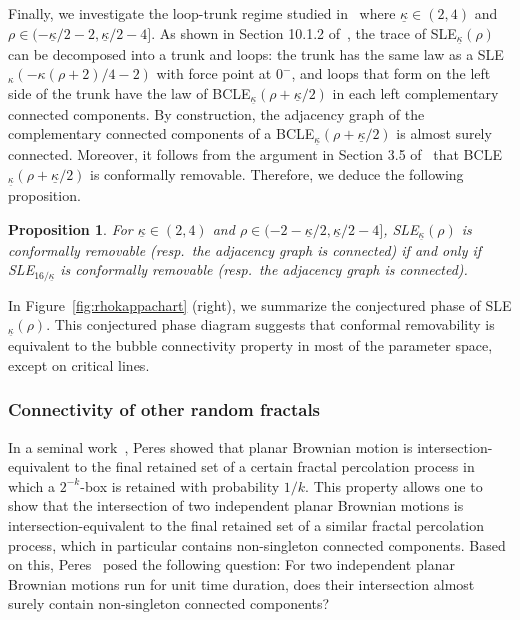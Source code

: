 \documentclass[a4paper]{article}
\numberwithin{equation}{section}
\newtheorem{proposition}[theorem]{Proposition}
\numberwithin{equation}{section}
\renewcommand{\1}{\mathbf{1}}
\begin{document}
Finally, we investigate the loop-trunk regime studied in~\cite{CLEpercolation} where $\underline{\kappa} \in (2,4)$ and $\rho \in (-\underline{\kappa}/2-2, \underline{\kappa}/2-4]$. As shown in Section 10.1.2 of~\cite{CLEpercolation}, the trace of SLE$_{\underline{\kappa}}(\rho)$ can be decomposed into a trunk and loops: the trunk has the same law as a SLE$_{\kappa}(-\kappa(\rho+2)/4-2)$ with force point at $0^-$, and loops that form on the left side of the trunk have the law of BCLE$_{\underline{\kappa}}(\rho + \underline{\kappa}/2)$ in each left complementary connected components. By construction, the adjacency graph of the complementary connected components of a BCLE$_{\underline{\kappa}}(\rho + \underline{\kappa}/2)$ is almost surely connected. Moreover, it follows from the argument in Section 3.5 of~\cite{DMS21-LQG-MRT} that BCLE$_{\underline{\kappa}}(\rho + \underline{\kappa}/2)$ is conformally removable. Therefore, we deduce the following proposition.

\begin{proposition}
    For $\underline{\kappa} \in (2,4)$ and $\rho \in (-2-\underline{\kappa}/2, \underline{\kappa}/2-4]$, SLE$_{\underline{\kappa}}(\rho)$ is conformally removable (resp.\ the adjacency graph is connected) if and only if SLE$_{16/\underline{\kappa}}$ is conformally removable (resp.\ the adjacency graph is connected).
\end{proposition}

In Figure~\ref{fig:rhokappachart} (right), we summarize the conjectured phase of SLE$_{\underline{\kappa}}(\rho)$. This conjectured phase diagram suggests that conformal removability is equivalent to the bubble connectivity property in most of the parameter space, except on critical lines.

\subsubsection*{Connectivity of other random fractals}

In a seminal work~\cite{Peres-intersection}, Peres showed that planar Brownian motion is intersection-equivalent to the final retained set of a certain fractal percolation process in which a $2^{-k}$-box is retained with probability $1/k$. This property allows one to show that the intersection of two independent planar Brownian motions is intersection-equivalent to the final retained set of a similar fractal percolation process, which in particular contains non-singleton connected components. Based on this, Peres~\cite{peres-brownian-intersection} posed the following question: For two independent planar Brownian motions run for unit time duration, does their intersection almost surely contain non-singleton connected components?
\end{document}
